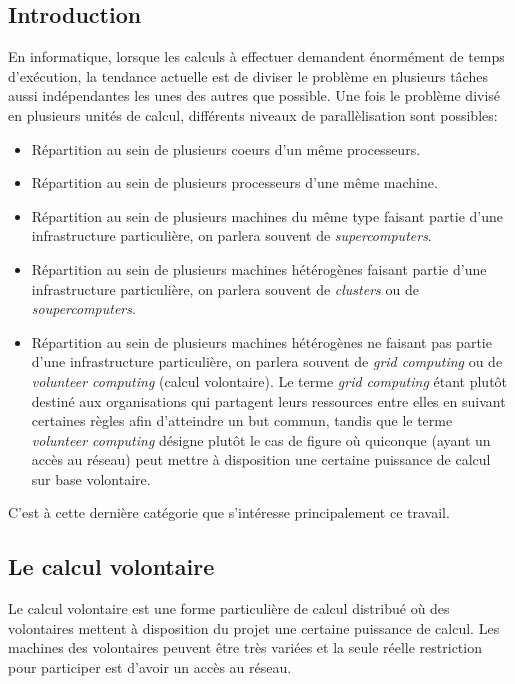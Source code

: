 \documentclass[a4paper, 11pt]{report}
\begin{document}
\subsection{Introduction}
En informatique, lorsque les calculs à effectuer demandent énormément de temps d'exécution, la tendance actuelle est de diviser le problème en plusieurs tâches aussi indépendantes les unes des autres que possible. Une fois le problème divisé en plusieurs unités de calcul, différents niveaux de parallèlisation sont possibles:
\begin{itemize}
\item Répartition au sein de plusieurs coeurs d'un même processeurs. %
\item Répartition au sein de plusieurs processeurs d'une même machine. %
\item Répartition au sein de plusieurs machines du même type faisant partie d'une infrastructure particulière, on parlera souvent de \textit{supercomputers}.
\item Répartition au sein de plusieurs machines hétérogènes faisant partie d'une infrastructure particulière, on parlera souvent de \textit{clusters} ou de \textit{soupercomputers}. %
\item Répartition au sein de plusieurs machines hétérogènes ne faisant pas partie d'une infrastructure particulière, on parlera souvent de \textit{grid computing} ou de \textit{volunteer computing} (calcul volontaire). Le terme \textit{grid computing} étant plutôt destiné aux organisations qui partagent leurs ressources entre elles en suivant certaines règles afin d'atteindre un but commun, tandis que le terme \textit{volunteer computing} désigne plutôt le cas de figure où quiconque (ayant un accès au réseau) peut mettre à disposition une certaine puissance de calcul sur base volontaire.
\end{itemize}
C'est à cette dernière catégorie que s'intéresse principalement ce travail. 

\subsection{Le calcul volontaire}
Le calcul volontaire est une forme particulière de calcul distribué où des volontaires mettent à disposition du projet une certaine puissance de calcul. Les machines des volontaires peuvent être très variées et la seule réelle restriction pour participer est d'avoir un accès au réseau. 
\end{document}
